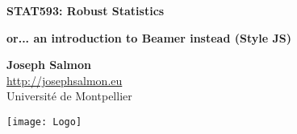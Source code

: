\documentclass[unknownkeysallowed]{beamer}
\begin{document}



\begin{frame}
    \bigskip
    \bigskip
    \begin{center}{
            \LARGE\color{marron}
            \textbf{STAT593: Robust Statistics}
            \textbf{ }\\
            \vspace{0.5cm}
        }

        \color{marron}
        \textbf{or... an introduction to Beamer instead (Style JS)}
    \end{center}

    \vspace{0.5cm}

    \begin{center}
        \textbf{Joseph Salmon} \\
        \vspace{0.1cm}
        \url{http://josephsalmon.eu}\\
        \vspace{0.5cm}
        Université de Montpellier \\
    \end{center}

    \centering
    \texttt{[image: Logo]}

\end{frame}





\end{document}
